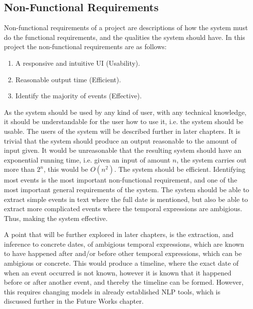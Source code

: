 \subsection{Non-Functional Requirements}
\par Non-functional requirements of a project are descriptions of how the system must do the functional requirements, and the qualities the system should have. In this project the non-functional requirements are as follows:
\begin{enumerate}
\item A responsive and intuitive UI (Usability).
\item Reasonable output time (Efficient).
\item Identify the majority of events (Effective).
\end{enumerate}
\par As the system should be used by any kind of user, with any technical knowledge, it should be understandable for the user how to use it, i.e. the system should be usable. The users of the system will be described further in later chapters. It is trivial that the system should produce an output reasonable to the amount of input given. It would be unreasonable that the resulting system should have an exponential running time, i.e. given an input of amount $n$, the system carries out more than $2^n$, this would be $O(n^2)$. The system should be efficient. Identifying most events is the most important non-functional requirement, and one of the most important general requirements of the system. The system should be able to extract simple events in text where the full date is mentioned, but also be able to extract more complicated events where the temporal expressions are ambigious. Thus, making the system effective.
\par A point that will be further explored in later chapters, is the extraction, and inference to concrete dates, of ambigious temporal expressions, which are known to have happened after and/or before other temporal expressions, which can be ambigious or concrete. This would produce a timeline, where the exact date of when an event occurred is not known, however it is known that it happened before or after another event, and thereby the timeline can be formed. However, this requires changing models in already established NLP tools, which is discussed further in the Future Works chapter.

